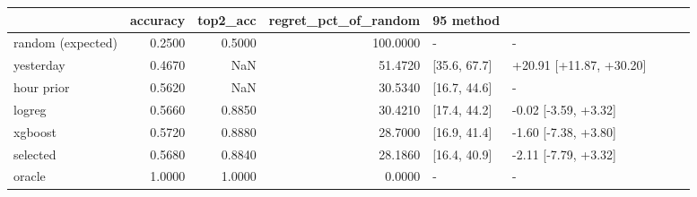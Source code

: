 \begin{tabular}{lrrrll}
\toprule
 & accuracy & top2_acc & regret_pct_of_random & 95%
method &  &  &  &  &  \\
\midrule
random (expected) & 0.2500 & 0.5000 & 100.0000 & - & - \\
yesterday & 0.4670 & NaN & 51.4720 & [35.6, 67.7] & +20.91 [+11.87, +30.20] \\
hour prior & 0.5620 & NaN & 30.5340 & [16.7, 44.6] & - \\
logreg & 0.5660 & 0.8850 & 30.4210 & [17.4, 44.2] & -0.02 [-3.59, +3.32] \\
xgboost & 0.5720 & 0.8880 & 28.7000 & [16.9, 41.4] & -1.60 [-7.38, +3.80] \\
selected & 0.5680 & 0.8840 & 28.1860 & [16.4, 40.9] & -2.11 [-7.79, +3.32] \\
oracle & 1.0000 & 1.0000 & 0.0000 & - & - \\
\bottomrule
\end{tabular}
